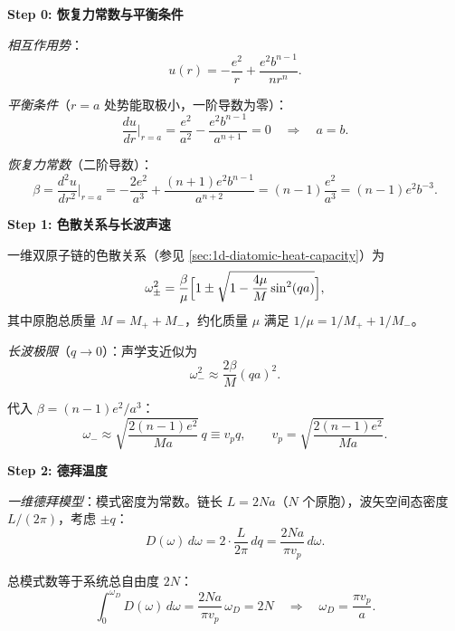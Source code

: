 \begin{derivationbox}[标准解题过程]
\textbf{Step 0: 恢复力常数与平衡条件}

\textit{相互作用势}：
\begin{equation}
u(r)=-\frac{e^2}{r}+\frac{e^2b^{n-1}}{nr^n}.
\end{equation}

\textit{平衡条件}（$r=a$ 处势能取极小，一阶导数为零）：
\begin{equation}
\frac{du}{dr}\bigg|_{r=a}=\frac{e^2}{a^2}-\frac{e^2b^{n-1}}{a^{n+1}}=0
\quad\Longrightarrow\quad a=b.
\end{equation}

\textit{恢复力常数}（二阶导数）：
\begin{equation}
\beta=\frac{d^2u}{dr^2}\bigg|_{r=a}=-\frac{2e^2}{a^3}+\frac{(n+1)e^2b^{n-1}}{a^{n+2}}
=(n-1)\frac{e^2}{a^3}=(n-1)e^2b^{-3}.
\end{equation}

\textbf{Step 1: 色散关系与长波声速}

一维双原子链的色散关系（参见 \ref{sec:1d-diatomic-heat-capacity}）为
\begin{equation}
\omega_{\pm}^2=\frac{\beta}{\mu}\Bigl[1\pm\sqrt{1-\frac{4\mu}{M}\sin^2(qa)}\Bigr],
\end{equation}
其中原胞总质量 $M=M_++M_-$，约化质量 $\mu$ 满足 $1/\mu=1/M_++1/M_-$。

\textit{长波极限}（$q\to0$）：声学支近似为
\begin{equation}
\omega_-^2\approx\frac{2\beta}{M}(qa)^2.
\end{equation}

代入 $\beta=(n-1)e^2/a^3$：
\begin{equation}
\omega_-\approx\sqrt{\frac{2(n-1)e^2}{Ma}}\,q\equiv v_pq,
\qquad v_p=\sqrt{\frac{2(n-1)e^2}{Ma}}.
\end{equation}

\textbf{Step 2: 德拜温度}

\textit{一维德拜模型}：模式密度为常数。链长 $L=2Na$（$N$ 个原胞），波矢空间态密度 $L/(2\pi)$，考虑 $\pm q$：
\begin{equation}
D(\omega)\,d\omega=2\cdot\frac{L}{2\pi}\,dq=\frac{2Na}{\pi v_p}\,d\omega.
\end{equation}

总模式数等于系统总自由度 $2N$：
\begin{equation}
\int_0^{\omega_D}D(\omega)\,d\omega=\frac{2Na}{\pi v_p}\,\omega_D=2N
\quad\Longrightarrow\quad
\omega_D=\frac{\pi v_p}{a}.
\end{equation}


\end{derivationbox}

